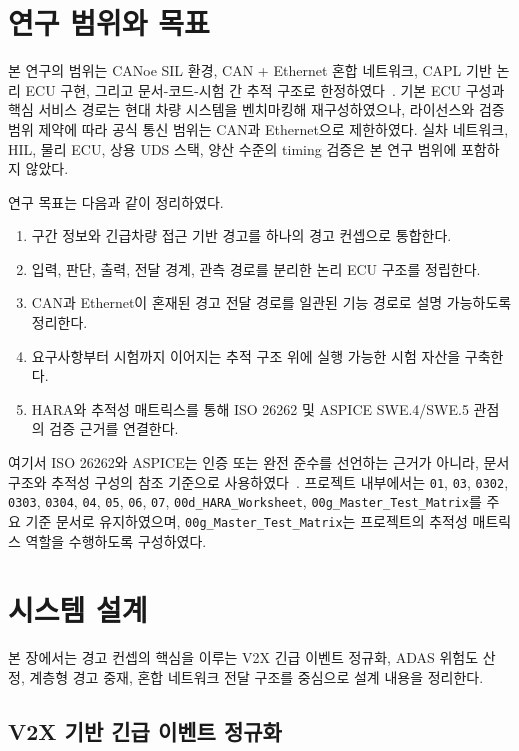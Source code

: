 \documentclass[10pt,a4paper,twocolumn]{article}
\begin{document}
\section{연구 범위와 목표}

본 연구의 범위는 CANoe SIL 환경, CAN + Ethernet 혼합 네트워크, CAPL 기반 논리 ECU 구현, 그리고 문서-코드-시험 간 추적 구조로 한정하였다~\cite{canoe}. 기본 ECU 구성과 핵심 서비스 경로는 현대 차량 시스템을 벤치마킹해 재구성하였으나, 라이선스와 검증 범위 제약에 따라 공식 통신 범위는 CAN과 Ethernet으로 제한하였다. 실차 네트워크, HIL, 물리 ECU, 상용 UDS 스택, 양산 수준의 timing 검증은 본 연구 범위에 포함하지 않았다.

연구 목표는 다음과 같이 정리하였다.

\begin{enumerate}[label=\arabic*.]
\item 구간 정보와 긴급차량 접근 기반 경고를 하나의 경고 컨셉으로 통합한다.
\item 입력, 판단, 출력, 전달 경계, 관측 경로를 분리한 논리 ECU 구조를 정립한다.
\item CAN과 Ethernet이 혼재된 경고 전달 경로를 일관된 기능 경로로 설명 가능하도록 정리한다.
\item 요구사항부터 시험까지 이어지는 추적 구조 위에 실행 가능한 시험 자산을 구축한다.
\item HARA와 추적성 매트릭스를 통해 ISO 26262 및 ASPICE SWE.4/SWE.5 관점의 검증 근거를 연결한다.
\end{enumerate}

여기서 ISO 26262와 ASPICE는 인증 또는 완전 준수를 선언하는 근거가 아니라, 문서 구조와 추적성 구성의 참조 기준으로 사용하였다~\cite{iso26262,aspice_spice,aspice_training}. 프로젝트 내부에서는 \texttt{01}, \texttt{03}, \texttt{0302}, \texttt{0303}, \texttt{0304}, \texttt{04}, \texttt{05}, \texttt{06}, \texttt{07}, \texttt{00d\_HARA\_Worksheet}, \texttt{00g\_Master\_Test\_Matrix}를 주요 기준 문서로 유지하였으며, \texttt{00g\_Master\_Test\_Matrix}는 프로젝트의 추적성 매트릭스 역할을 수행하도록 구성하였다.

\section{시스템 설계}

본 장에서는 경고 컨셉의 핵심을 이루는 V2X 긴급 이벤트 정규화, ADAS 위험도 산정, 계층형 경고 중재, 혼합 네트워크 전달 구조를 중심으로 설계 내용을 정리한다.

\subsection{V2X 기반 긴급 이벤트 정규화}
\end{document}
